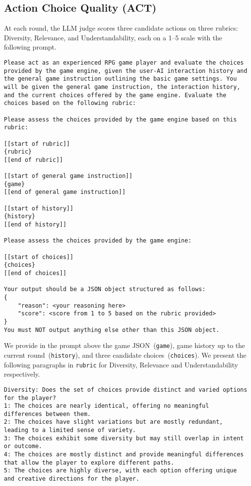 \subsection{Action Choice Quality (ACT)}
At each round, the LLM judge scores three candidate actions on three rubrics: Diversity, Relevance, and Understandability, each on a 1--5 scale with the following prompt. 
\begin{center}
\begin{minipage}{0.95\textwidth}
\begin{lstlisting}[language=plaintext, frame=none, numbers=none]
Please act as an experienced RPG game player and evaluate the choices provided by the game engine, given the user-AI interaction history and the general game instruction outlining the basic game settings. You will be given the general game instruction, the interaction history, and the current choices offered by the game engine. Evaluate the choices based on the following rubric:

Please assess the choices provided by the game engine based on this rubric:

[[start of rubric]]
{rubric}
[[end of rubric]]

[[start of general game instruction]]
{game}
[[end of general game instruction]]

[[start of history]]
{history}
[[end of history]]

Please assess the choices provided by the game engine:

[[start of choices]]
{choices}
[[end of choices]]

Your output should be a JSON object structured as follows:
{
    "reason": <your reasoning here>
    "score": <score from 1 to 5 based on the rubric provided>
}
You must NOT output anything else other than this JSON object.
\end{lstlisting}
\end{minipage}
\end{center}
We provide in the prompt above the game JSON~(\texttt{game}), game history up to the current round~(\texttt{history}), and three candidate choices~(\texttt{choices}). We present the following paragraphs in \texttt{rubric} for Diversity, Relevance and Understandability respectively.
\begin{center}
\begin{minipage}{0.95\textwidth}
\begin{lstlisting}[language=plaintext, frame=none, numbers=none]
Diversity: Does the set of choices provide distinct and varied options for the player?
1: The choices are nearly identical, offering no meaningful differences between them.
2: The choices have slight variations but are mostly redundant, leading to a limited sense of variety.
3: The choices exhibit some diversity but may still overlap in intent or outcome.
4: The choices are mostly distinct and provide meaningful differences that allow the player to explore different paths.
5: The choices are highly diverse, with each option offering unique and creative directions for the player.
\end{lstlisting}
\end{minipage}
\end{center}
